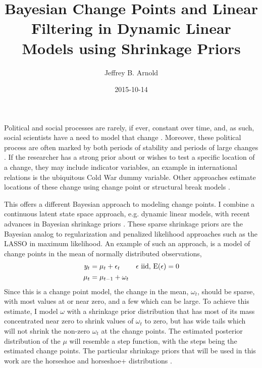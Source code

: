 \documentclass[12pt]{article}
\author{Jeffrey B. Arnold}
\date{2015-10-14}
\title{Bayesian Change Points and Linear Filtering in Dynamic Linear Models using Shrinkage Priors}
\begin{document}
\newcommand{\ModelII}[1]{\texttt{#1}}

\maketitle{}

Political and social processes are rarely, if ever, constant over time, and, as such, social scientists have a need to model that change \parencites{Buethe2002a}{Lieberman2002a}.
Moreover, these political process are often marked by both periods of stability and periods of large changes \parencites{Pierson2004}.
If the researcher has a strong prior about or wishes to test a specific location of a change, they may include indicator variables, an example in international relations is the ubiquitous Cold War dummy variable.
Other approaches estimate locations of these change using change point or structural break models \parencites{CalderiaZorn1998}{WesternKleykamp2004}{Spirling2007a}{Spirling2007b}{Park2010}{Park2011}{Blackwell2012}.

This offers a different Bayesian approach to modeling change points.
I combine a continuous latent state space approach, e.g. dynamic linear models, with recent advances in Bayesian shrinkage priors \parencites{CarvalhoPolsonScott2009}{CarvalhoPolsonScott2010}{PolsonScott2010}.
These sparse shrinkage priors are the Bayesian analog to regularization and penalized likelihood approaches such as the LASSO \parencites{Tibshirani1996} in maximum likelihood.
An example of such an approach, is a model of change points in the mean of normally distributed observations,
\begin{equation}
  \label{dlm:eq:31}
  \begin{aligned}[t]
  y_{t} &= \mu_{t} + \epsilon_{t} & \text{$\epsilon$ iid, $\operatorname{E}(\epsilon) = 0$} \\
  \mu_{t} &= \mu_{t - 1} + \omega_{t}
  \end{aligned}
\end{equation}
Since this is a change point model, the change in the mean, $\omega_{t}$, should be sparse, with most values at or near zero, and a few which can be large.
To achieve this estimate, I model $\omega$ with a shrinkage prior distribution that has most of its mass concentrated near zero to shrink values of $\omega_{t}$ to zero, but has wide tails which will not shrink the non-zero $\omega_{t}$ at the change points.
The estimated posterior distribution of the $\mu$ will resemble a step function, with the steps being the estimated change points.
The particular shrinkage priors that will be used in this work are the horseshoe \parencites{CarvalhoPolsonScott2009}{CarvalhoPolsonScott2010} and horseshoe+ distributions \parencite{BhadraDattaPolsonEtAl2015a}.
\end{document}
